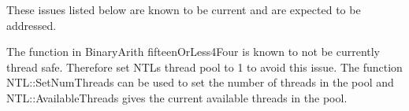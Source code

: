 These issues listed below are known to be current and are expected to be addressed.

The function in Binary\+Arith {\ttfamily fifteen\+Or\+Less4\+Four} is known to not be currently thread safe. Therefore set N\+TL\textquotesingle{}s thread pool to 1 to avoid this issue. The function {\ttfamily N\+T\+L\+::\+Set\+Num\+Threads} can be used to set the number of threads in the pool and {\ttfamily N\+T\+L\+::\+Available\+Threads} gives the current available threads in the pool. 